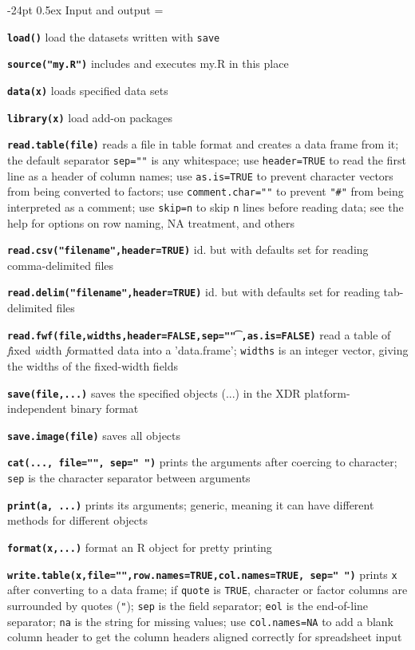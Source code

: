 \documentclass[10pt,landscape]{article}
\makeatletter
\renewcommand\section{\@startsection{section}{1}{0mm}%
                                     {-24pt}%
                                     {0.5ex}%
                                {\color{blue}\normalfont\large\bfseries}}
\newcommand{\code}{\texttt}
\newcommand{\bcode}[1]{\texttt{\textbf{#1}}}
\makeatother
\begin{document}
\begin{multicols*}{3}
\section{Input and output}
\everypar={\hangindent=9mm}

\bcode{load()} load the datasets written with \code{save}

\bcode{source("my.R")} includes and executes my.R in this place

\bcode{data(x)} loads specified data sets

\bcode{library(x)} load add-on packages

\bcode{read.table(file)} reads a file in table format and
                creates a data frame from it; the default separator
                \code{sep=""} is any whitespace; use \code{header=TRUE}
                to read the first line as a header of column names; use \code{as.is=TRUE} to
                prevent character vectors from being converted to
                factors; use \code{comment.char=""} to prevent
                \code{"\#"} from being interpreted as a comment; use
                \code{skip=n} to skip \code{n} lines before reading data; see
                the help for options on row naming, NA treatment, and
                others

\bcode{read.csv("filename",header=TRUE)} id. but with defaults set for reading
comma-delimited files

\bcode{read.delim("filename",header=TRUE)} id. but with defaults set for reading
tab-delimited files

\bcode{read.fwf(file,widths,header=FALSE,sep="\t",as.is=FALSE)} read a table of \emph{f}ixed \emph{w}idth \emph{f}ormatted data into a
     'data.frame'; \code{widths} is an integer vector, giving the widths of the fixed-width fields

\bcode{save(file,...)} saves the specified objects (...) in the XDR
platform-independent binary format

\bcode{save.image(file)} saves all objects

\bcode{cat(..., file="", sep=" ")} prints the arguments after coercing to
character; \code{sep} is the character separator between arguments

\bcode{print(a, ...)} prints its arguments; generic, meaning it can
have different methods for different objects

\bcode{format(x,...)} format an R object for pretty printing

\bcode{write.table(x,file="",row.names=TRUE,col.names=TRUE, sep=" ")} 
prints \code{x} after converting to a data frame; if \code{quote} is
                 \code{TRUE}, character or factor columns are
                 surrounded by quotes (\code{"}); \code{sep} is the field
                 separator; \code{eol} is the end-of-line separator;
                 \code{na} is the string for missing values; use
                 \code{col.names=NA} to add a blank column header to
                 get the column headers aligned correctly for
                 spreadsheet input


\end{multicols*}
\end{document}
